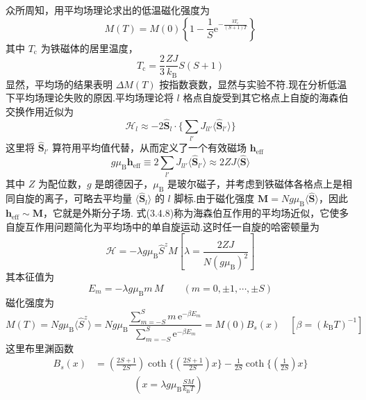 众所周知，用平均场理论求出的低温磁化强度为
\begin{equation}
  M\left(T\right)=M\left(0\right)\left\{1-\frac{1}{S}\mathrm{e}^{-\frac{3T_{\mathrm{c}}}{\left(S+1\right)T}}\right\}
\end{equation}
其中 $T_{\mathrm{c}}$ 为铁磁体的居里温度，
\begin{equation}
  T_{\mathrm{c}}=\frac{2}{3}\frac{ZJ}{k_{\mathrm{B}}}S\left(S+1\right)
\end{equation}
显然，平均场的结果表明 $\Delta M\left(T\right)$
按指数衰数，显然与实验不符.现在分析低温下平均场理论失败的原因.平均场理论将 $l$
格点自旋受到其它格点上自旋的海森伯交换作用近似为
\begin{equation}
  \mathcal{H}_l\approx-2\hat{\boldsymbol{S}}_l\cdot\biggl\{\sum_{l'}J_{ll'}\langle\hat{\boldsymbol{S}}_{l'}\rangle\biggr\}
\end{equation}
这里将 $\hat{\boldsymbol{S}}_{l'}$ 算符用平均值代替，从而定义了一个有效磁场 $\boldsymbol{h}_{\mathrm{eff}}$
\begin{equation}
  g\mu_{\mathrm{B}}\boldsymbol{h}_{\mathrm{eff}}\equiv2\sum_{l'}J_{ll'}\langle\hat{\boldsymbol{S}}_{l'}\rangle
  \approx2ZJ\langle\hat{\boldsymbol{S}}\rangle
\end{equation}
其中 $Z$ 为配位数，$g$ 是朗德因子，$\mu_{\mathrm{B}}$
是玻尔磁子，并考虑到铁磁体各格点上是相同自旋的离子，可略去平均量 $\langle\hat{\boldsymbol{S}}_l\rangle$ 的
$l$ 脚标.由于磁化强度 $\boldsymbol{M}=Ng\mu_{\mathrm{B}}\langle\hat{\boldsymbol{S}}\rangle$，因此
$\boldsymbol{h}_{\mathrm{eff}}\sim\boldsymbol{M}$，它就是外斯分子场.
式(3.4.8)称为海森伯互作用的平均场近似，它使多自旋互作用问题简化为平均场中的单自旋运动.这时任一自旋的哈密顿量为
\begin{equation*}
  \mathcal{H}=-\lambda g\mu_{\mathrm{B}}\hat{S}^{z}M
  \left[\lambda=\frac{2ZJ}{N\left(g\mu_{\mathrm{B}}\right)^2}\right]
\end{equation*}
其本征值为
\begin{equation}
  E_m=-\lambda g\mu_{\mathrm{B}}m\,M\qquad\left(m=0,\pm1,\cdots,\pm S\right)
\end{equation}
磁化强度为
\begin{equation}
  M\left(T\right)=Ng\mu_{\mathrm{B}}\langle\hat{S}^{z}\rangle
  =Ng\mu_{\mathrm{B}}\frac{\displaystyle\sum_{m=-S}^{S}m\,\mathrm{e}^{-\beta E_m}}
  {\displaystyle\sum_{m=-S}^{S}\mathrm{e}^{-\beta E_m}}
  =M\left(0\right)B_s(x)\quad\left[\beta=\left(k_{\mathrm{B}}T\right)^{-1}\right]
\end{equation}
这里布里渊函数
\begin{equation}
\begin{aligned}
  B_s\left(x\right)&=\left(\frac{2S+1}{2S}\right)\coth\biggl\{\left(\frac{2S+1}{2S}\right)x\biggr\}
  -\frac{1}{2S}\coth\biggl\{\left(\frac{1}{2S}\right)x\biggr\}\\
  &\qquad\qquad\left(x=\lambda g\mu_{\mathrm{B}}\frac{SM}{k_{\mathrm{B}}T}\right)
\end{aligned}
\end{equation}
